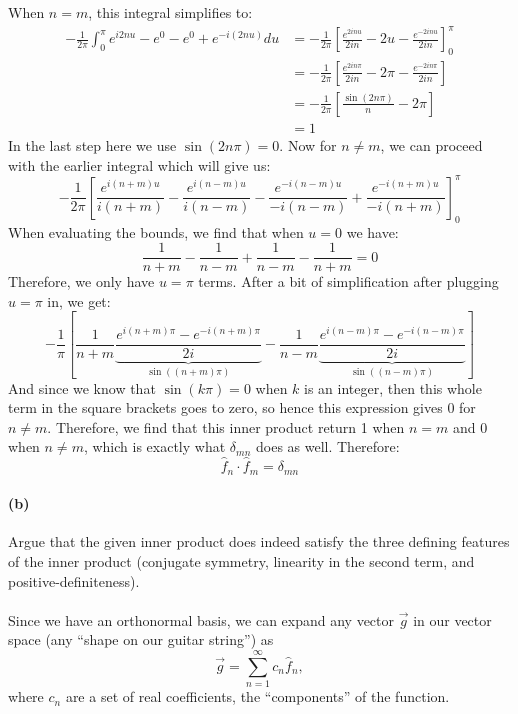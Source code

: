 \documentclass{article}
\begin{document}
\begin{solution}
    When $n = m$, this integral simplifies to:
    \begin{align*}
        -\frac{1}{2\pi} \int_0^\pi e^{i 2nu} - e^0  - e^0 + e^{-i(2nu)} du &= -\frac{1}{2\pi} \left[\frac{e^{2inu}}{2in} - 2u - \frac{e^{-2inu}}{2in}\right]_0^\pi\\
        &= -\frac{1}{2\pi} \left[\frac{e^{2in \pi}}{2in} - 2\pi - \frac{e^{-2i n \pi}}{2in}\right]\\
        &= -\frac{1}{2\pi} \left[\frac{\sin(2n\pi)}{n} - 2\pi\right]\\
        &= 1
    \end{align*}
    In the last step here we use $\sin(2n \pi) = 0$. Now for $n \neq m$, we can proceed with the earlier integral which will give us:
    \[ -\frac{1}{2\pi} \left[ \frac{e^{i(n + m)u}}{i(n + m)} - \frac{e^{i(n - m)u}}{i(n - m)} - \frac{e^{-i(n - m) u }}{-i(n - m)} + \frac{e^{-i(n +m)u}}{-i(n + m)}\right]_0^\pi\]
    When evaluating the bounds, we find that when $u = 0$ we have: 
    \[ \frac{1}{n + m} - \frac{1}{n - m} + \frac{1}{n - m} - \frac{1}{n + m} = 0\]
    Therefore, we only have $u = \pi$ terms. After a bit of simplification after plugging $u = \pi$ in, we get:
    \[
        -\frac{1}{\pi}\left[ \frac{1}{n + m}\underbrace{\frac{e^{i(n + m)\pi} - e^{-i(n + m)\pi}}{2i}}_{\sin((n + m) \pi)} - \frac{1}{n - m} \underbrace{\frac{e^{i (n - m)\pi} - e^{-i(n - m) \pi}}{2i}}_{\sin((n - m)\pi)}\right]
    \]
    And since we know that $\sin(k\pi) = 0$ when $k$ is an integer, then this whole term in the square brackets goes to zero, so hence this expression gives 0 for $n \neq m$. Therefore, we find that this inner product return 1 when $n = m$ and 0 when $n \neq m$, which is exactly what $\delta_{mn}$ does as well. Therefore: 
    \[ \hat f_n \cdot \hat f_m = \delta_{mn}\]
\end{solution}

\paragraph{(b)}		\extrapart
Argue that the given inner product does indeed satisfy the three defining features of the inner product (conjugate symmetry, linearity in the second term, and positive-definiteness).


\phline
\paragraph{}
Since we have an orthonormal basis, we can expand any vector $\vec{g}$ in our vector space (any ``shape on our guitar string'') as
	\begin{equation}
		\vec{g} = \sum_{n=1}^{\infty} c_{n}\hat{f}_{n},
	\label{expansion}
	\end{equation}
where $c_{n}$ are a set of real coefficients, the ``components'' of the function.
\end{document}
